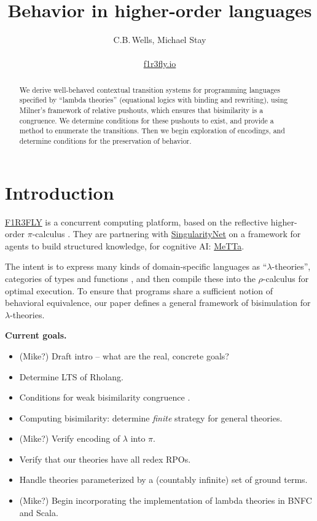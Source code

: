\documentclass{article}
\title{Behavior in higher-order languages}
\author{C.B.\,Wells, Michael Stay\\~\\ \url{f1r3fly.io}}
\date{}
\begin{document}
\maketitle

\begin{abstract}
    We derive well-behaved contextual transition systems for programming languages specified by ``lambda theories'' (equational logics with binding and rewriting), using Milner's framework of relative pushouts, which ensures that bisimilarity is a congruence. We determine conditions for these pushouts to exist, and provide a method to enumerate the transitions. Then we begin exploration of encodings, and determine conditions for the preservation of behavior.
\end{abstract}

\tableofcontents

\section{Introduction}

\href{https://github.com/F1R3FLY-io}{F1R3FLY} is a concurrent computing platform, based on the reflective higher-order $\pi$-calculus \cite{rho}. They are partnering with \href{https://singularitynet.io/}{SingularityNet} on a framework for agents to build structured knowledge, for cognitive AI: \href{https://metta-lang.dev/}{MeTTa}. 

The intent is to express many kinds of domain-specific languages as ``$\lambda$-theories'', categories of types and functions \cite{ntt}, and then compile these into the $\rho$-calculus for optimal execution. To ensure that programs share a sufficient notion of behavioral equivalence, our paper defines a general framework of bisimulation for $\lambda$-theories.

\newpage

\textbf{Current goals.}

\begin{itemize}
    \item (Mike?) Draft intro -- what are the real, concrete goals?
    \item Determine LTS of Rholang.
    \item Conditions for weak bisimilarity congruence \cite{lambda-lts}.
    \item Computing bisimilarity: determine \textit{finite} strategy for general theories.
    \item (Mike?) Verify encoding of $\lambda$ into $\pi$.
    \item Verify that our theories have all redex RPOs.
    \item Handle theories parameterized by a (countably infinite) set of ground terms.
    \item (Mike?) Begin incorporating the implementation of lambda theories in BNFC and Scala.
\end{itemize}
\end{document}
